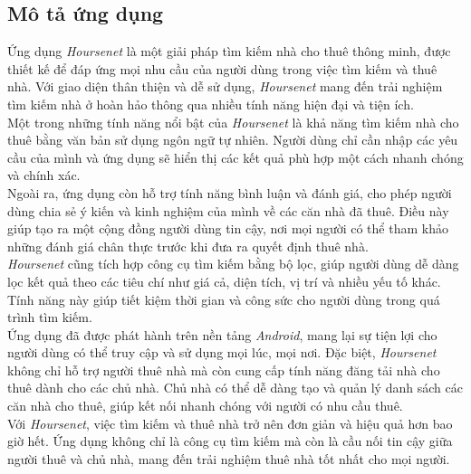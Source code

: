 \subsection{Mô tả ứng dụng}
\hspace*{1cm}
Ứng dụng \textit{Hoursenet} là một giải pháp tìm kiếm nhà cho thuê thông minh, được thiết kế để đáp ứng mọi nhu cầu của người dùng trong việc tìm kiếm và thuê nhà. Với giao diện thân thiện và dễ sử dụng, \textit{Hoursenet} mang đến trải nghiệm tìm kiếm nhà ở hoàn hảo thông qua nhiều tính năng hiện đại và tiện ích.\\
\hspace*{1cm}
Một trong những tính năng nổi bật của \textit{Hoursenet} là khả năng tìm kiếm nhà cho thuê bằng văn bản sử dụng ngôn ngữ tự nhiên. Người dùng chỉ cần nhập các yêu cầu của mình và ứng dụng sẽ hiển thị các kết quả phù hợp một cách nhanh chóng và chính xác.\\
\hspace*{1cm}
Ngoài ra, ứng dụng còn hỗ trợ tính năng bình luận và đánh giá, cho phép người dùng chia sẻ ý kiến và kinh nghiệm của mình về các căn nhà đã thuê. Điều này giúp tạo ra một cộng đồng người dùng tin cậy, nơi mọi người có thể tham khảo những đánh giá chân thực trước khi đưa ra quyết định thuê nhà.\\
\hspace*{1cm}
\textit{Hoursenet} cũng tích hợp công cụ tìm kiếm bằng bộ lọc, giúp người dùng dễ dàng lọc kết quả theo các tiêu chí như giá cả, diện tích, vị trí và nhiều yếu tố khác. Tính năng này giúp tiết kiệm thời gian và công sức cho người dùng trong quá trình tìm kiếm.\\
\hspace*{1cm}
Ứng dụng đã được phát hành trên nền tảng \textit{Android}, mang lại sự tiện lợi cho người dùng có thể truy cập và sử dụng mọi lúc, mọi nơi. Đặc biệt, \textit{Hoursenet} không chỉ hỗ trợ người thuê nhà mà còn cung cấp tính năng đăng tải nhà cho thuê dành cho các chủ nhà. Chủ nhà có thể dễ dàng tạo và quản lý danh sách các căn nhà cho thuê, giúp kết nối nhanh chóng với người có nhu cầu thuê.\\
\hspace*{1cm}
Với \textit{Hoursenet}, việc tìm kiếm và thuê nhà trở nên đơn giản và hiệu quả hơn bao giờ hết. Ứng dụng không chỉ là công cụ tìm kiếm mà còn là cầu nối tin cậy giữa người thuê và chủ nhà, mang đến trải nghiệm thuê nhà tốt nhất cho mọi người.